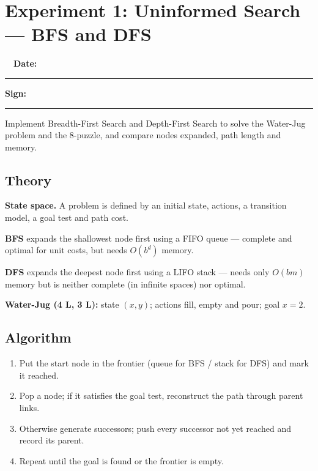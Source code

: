 \documentclass[11pt]{article}
\begin{document}
\section*{Experiment 1: Uninformed Search --- BFS and DFS}\label{exp1}
\noindent{}\ \ \hfill\textbf{\color{navy}Date:}\ \rule{3cm}{0.4pt}\quad\textbf{\color{navy}Sign:}\ \rule{3cm}{0.4pt}\par\medskip
\begin{keypoint}[Aim]Implement Breadth-First Search and Depth-First Search to solve the Water-Jug problem and the 8-puzzle, and compare nodes expanded, path length and memory.\end{keypoint}
\subsection*{Theory}
\textbf{State space.} A problem is defined by an initial state, actions, a transition model, a goal test and path cost.

\textbf{BFS} expands the shallowest node first using a FIFO queue --- complete and optimal for unit costs, but needs $O(b^d)$ memory.

\textbf{DFS} expands the deepest node first using a LIFO stack --- needs only $O(bm)$ memory but is neither complete (in infinite spaces) nor optimal.

\textbf{Water-Jug (4 L, 3 L):} state $(x,y)$; actions fill, empty and pour; goal $x=2$.
\subsection*{Algorithm}
\begin{algo}[Procedure]\begin{enumerate}
\item Put the start node in the frontier (queue for BFS / stack for DFS) and mark it reached.
\item Pop a node; if it satisfies the goal test, reconstruct the path through parent links.
\item Otherwise generate successors; push every successor not yet reached and record its parent.
\item Repeat until the goal is found or the frontier is empty.
\end{enumerate}\end{algo}
\end{document}

